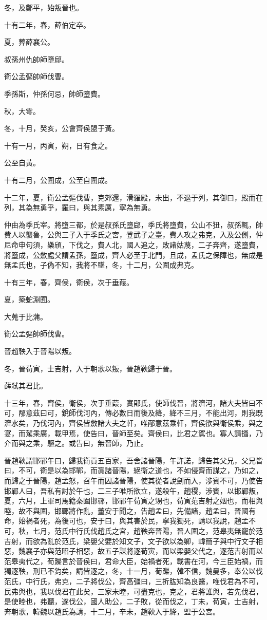 \begin{pinyinscope}
冬，及鄭平，始叛晉也。

十有二年，春，薛伯定卒。

夏，葬薛襄公。

叔孫州仇帥師墮郈。

衛公孟彄帥師伐曹。

季孫斯，仲孫何忌，帥師墮費。

秋，大雩。

冬，十月，癸亥，公會齊侯盟于黃。

十有一月，丙寅，朔，日有食之。

公至自黃。

十有二月，公圍成，公至自圍成。

十二年，夏，衛公孟彄伐曹，克郊還，滑羅殿，未出，不退于列，其御曰，殿而在列，其為無勇乎，羅曰，與其素厲，寧為無勇。

仲由為季氏宰。將墮三都，於是叔孫氏墮郈，季氏將墮費，公山不狃，叔孫輒，帥費人以襲魯，公與三子入于季氏之宮，登武子之臺，費人攻之弗克，入及公側，仲尼命申句須，樂頎，下伐之，費人北，國人追之，敗諸姑蔑，二子奔齊，遂墮費，將墮成，公斂處父謂孟孫，墮成，齊人必至于北門，且成，孟氏之保障也，無成是無孟氏也，子偽不知，我將不墜，冬，十二月，公圍成弗克。

十有三年，春，齊侯，衛侯，次于垂葭。

夏，築蛇淵囿。

大蒐于比蒲。

衛公孟彄帥師伐曹。

晉趙鞅入于晉陽以叛。

冬，晉荀寅，士吉射，入于朝歌以叛，晉趙鞅歸于晉。

薛弒其君比。

十三年，春，齊侯，衛侯，次于垂葭，實郥氏，使師伐晉，將濟河，諸大夫皆曰不可，邴意茲曰可，銳師伐河內，傳必數日而後及絳，絳不三月，不能出河，則我既濟水矣，乃伐河內，齊侯皆斂諸大夫之軒，唯邴意茲乘軒，齊侯欲與衛侯乘，與之宴，而駕乘廣，載甲焉，使告曰，晉師至矣。齊侯曰，比君之駕也。寡人請攝，乃介而與之乘，驅之。或告曰，無晉師，乃止。

晉趙鞅謂邯鄲午曰，歸我衛貢五百家，吾舍諸晉陽，午許諾，歸告其父兄，父兄皆曰，不可，衛是以為邯鄲，而寘諸晉陽，絕衛之道也，不如侵齊而謀之，乃如之，而歸之于晉陽，趙孟怒，召午而囚諸晉陽，使其從者說劍而入，涉賓不可，乃使告邯鄲人曰，吾私有討於午也，二三子唯所欲立，遂殺午，趙稷，涉賓，以邯鄲叛，夏，六月，上軍司馬籍秦圍邯鄲，邯鄲午荀寅之甥也，荀寅范吉射之姻也，而相與睦，故不與圍，邯鄲將作亂，董安于聞之，告趙孟曰，先備諸，趙孟曰，晉國有命，始禍者死，為後可也，安于曰，與其害於民，寧我獨死，請以我說，趙孟不可，秋，七月，范氏中行氏伐趙氏之宮，趙鞅奔晉陽，晉人圍之，范皋夷無寵於范吉射，而欲為亂於范氏，梁嬰父嬖於知文子，文子欲以為卿，韓簡子與中行文子相惡，魏襄子亦與范昭子相惡，故五子謀將逐荀寅，而以梁嬰父代之，逐范吉射而以范皋夷代之，荀躒言於晉侯曰，君命大臣，始禍者死，載書在河，今三臣始禍，而獨逐鞅，刑已不鈞矣，請皆逐之，冬，十一月，荀躒，韓不信，魏曼多，奉公以伐范氏，中行氏，弗克，二子將伐公，齊高彊曰，三折肱知為良醫，唯伐君為不可，民弗與也，我以伐君在此矣，三家未睦，可盡克也，克之，君將誰與，若先伐君，是使睦也，弗聽，遂伐公，國人助公，二子敗，從而伐之，丁未，荀寅，士吉射，奔朝歌，韓魏以趙氏為請，十二月，辛未，趙鞅入于絳，盟于公宮。


\end{pinyinscope}
